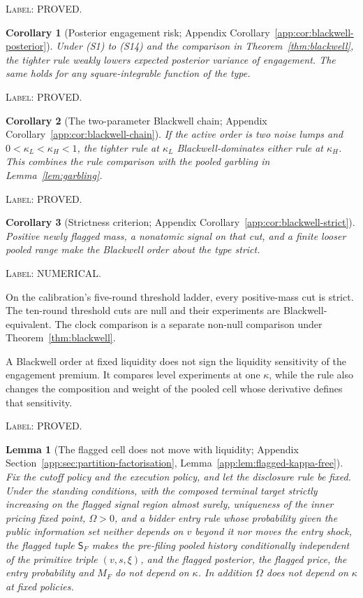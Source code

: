 \documentclass[11pt]{article}
\newtheorem{lemma}{Lemma}
\newtheorem{corollary}{Corollary}
\newcommand{\Sfl}{\mathsf{S}_F}
\begin{document}
\noindent\textsc{Label: PROVED.}\par
\begin{corollary}[Posterior engagement risk; Appendix Corollary~\ref{app:cor:blackwell-posterior}]
Under (S1) to (S14) and the comparison in Theorem~\ref{thm:blackwell}, the tighter rule weakly lowers
expected posterior variance of engagement. The same holds for any square-integrable function of the
type.
\end{corollary}

\noindent\textsc{Label: PROVED.}\par
\begin{corollary}[The two-parameter Blackwell chain; Appendix Corollary~\ref{app:cor:blackwell-chain}]
If the active order is two noise lumps and $0<\kappa_L<\kappa_H<1$, the tighter rule at
$\kappa_L$ Blackwell-dominates either rule at $\kappa_H$. This combines the rule comparison with the
pooled garbling in Lemma~\ref{lem:garbling}.
\end{corollary}

\noindent\textsc{Label: PROVED.}\par
\begin{corollary}[Strictness criterion; Appendix Corollary~\ref{app:cor:blackwell-strict}]
Positive newly flagged mass, a nonatomic signal on that cut, and a finite looser pooled range make
the Blackwell order about the type strict.
\end{corollary}

\noindent\textsc{Label: NUMERICAL.}\par
On the calibration's five-round threshold ladder, every positive-mass cut is strict. The ten-round
threshold cuts are null and their experiments are Blackwell-equivalent. The clock comparison is a
separate non-null comparison under Theorem~\ref{thm:blackwell}.

A Blackwell order at fixed liquidity does not sign the liquidity sensitivity of the engagement
premium. It compares level experiments at one $\kappa$, while the rule also changes the composition
and weight of the pooled cell whose derivative defines that sensitivity.

\noindent\textsc{Label: PROVED.}\par
\begin{lemma}[The flagged cell does not move with liquidity; Appendix Section~\ref{app:sec:partition-factorisation}, Lemma~\ref{app:lem:flagged-kappa-free}]
\label{lem:flagged}
Fix the cutoff policy and the execution policy, and let the disclosure rule be fixed. Under
the standing conditions, with the composed terminal target strictly increasing on the flagged
signal region almost surely, uniqueness of the inner pricing fixed point, $\Omega > 0$, and a
bidder entry rule whose probability given the public information set neither depends on $v$
beyond it nor moves the entry shock, the flagged tuple $\Sfl$ makes the pre-filing pooled
history conditionally independent of the primitive triple $(v,s,\xi)$, and the flagged
posterior, the flagged price, the entry probability and $M_F$ do not depend on $\kappa$. In
addition $\Omega$ does not depend on $\kappa$ at fixed policies.
\end{lemma}
\end{document}
